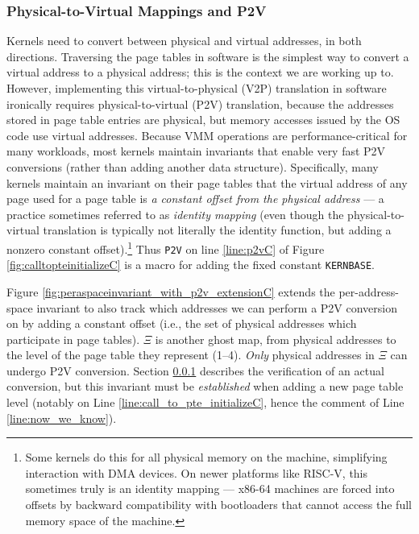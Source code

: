 \subsubsection{Physical-to-Virtual Mappings and \textsf{P2V}}
\label{sec:p2vC}
Kernels need to convert between physical and virtual addresses, in both directions.
Traversing the page tables in software is the simplest way to convert a virtual address to a physical address;
this is the context we are working up to.
However, implementing this virtual-to-physical (V2P) translation in software ironically requires physical-to-virtual (P2V) translation,
because the addresses stored in page table entries are physical, but memory accesses issued by the OS code use virtual addresses.
Because VMM operations are performance-critical for many workloads, most kernels
maintain invariants that enable very fast P2V conversions (rather than adding another data structure).
Specifically, many kernels maintain an invariant on their page tables that the virtual address of any page used for a page table 
is \emph{a constant offset from the physical address} --- a practice sometimes referred to as \emph{identity mapping} 
(even though the physical-to-virtual translation
is typically not literally the identity function, but adding a nonzero constant offset).\footnote{Some kernels do this for all physical memory on the machine, simplifying interaction
with DMA devices.
On newer platforms like RISC-V, this sometimes truly is an identity mapping ---
x86-64 machines are forced into offsets by backward compatibility with bootloaders that cannot access the full memory space of the
machine.
}
Thus \lstinline|P2V| on line \ref{line:p2vC} of Figure \ref{fig:calltopteinitializeC} is a macro for adding the fixed constant \lstinline|KERNBASE|.

Figure \ref{fig:peraspaceinvariant_with_p2v_extensionC} extends the per-address-space invariant  to also track which
addresses we can perform a P2V conversion on by adding a constant offset (i.e., the set of physical addresses which participate in page tables).
$\Xi$ is another ghost map, from physical addresses to the level of the page table they represent (1--4).
\emph{Only} physical addresses in $\Xi$ can undergo P2V conversion. 
Section \ref{sec:p2vC} describes the verification of an actual conversion,
but this invariant must be \emph{established} when adding a new page table level (notably on Line \ref{line:call_to_pte_initializeC},
hence the comment of Line \ref{line:now_we_know}).

